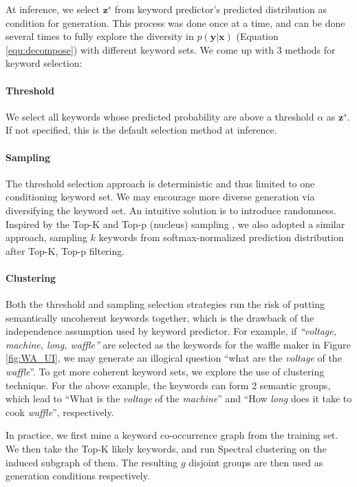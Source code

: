 At inference, we select $\mathbf{z}^s$ from keyword predictor's predicted distribution as condition for generation. This process was done once at a time, and can be done several times to fully explore the diversity in $p(\mathbf{y}|\mathbf{x})$ (Equation \ref{equ:decompose}) with different keyword sets. We come up with 3 methods for keyword selection:

\paragraph{Threshold} We select all keywords whose predicted probability are above a threshold $\alpha$ as $\mathbf{z}^s$. If not specified, this is the default selection method at inference.

\paragraph{Sampling} The threshold selection approach is deterministic and thus limited to one conditioning keyword set. We may encourage more diverse generation via diversifying the keyword set. An intuitive solution is to introduce randomness. Inspired by the Top-K \citep{fan-etal-2018-hierarchical, radford2019language} and Top-p (nucleus) sampling \citep{holtzman2019curious}, we also adopted a similar approach, sampling $k$ keywords from softmax-normalized prediction distribution after Top-K, Top-p filtering.

\paragraph{Clustering} Both the threshold and sampling selection strategies 
run the risk of putting semantically uncoherent keywords together, 
which is the drawback of the independence assumption used by keyword predictor. 
For example, if \textit{``voltage, machine, long, waffle''} are selected as 
the keywords for the waffle maker in Figure \ref{fig:WA_UI}, 
we may generate an illogical question ``what are the \textit{voltage} of 
the \textit{waffle}''. To get more coherent keyword sets, 
we explore the use of clustering technique. For the above example, 
the keywords can form 2 semantic groups, which lead to 
``What is the \textit{voltage} of the \textit{machine}'' and 
``How \textit{long} does it take to cook \textit{waffle}'', respectively. 

In practice, we first mine a keyword co-occurrence graph from the training set. We then take the Top-K likely keywords, and run Spectral clustering \citep{Shi00normalizedcuts} on the induced subgraph of them. The resulting $g$ disjoint groups are then used as generation conditions respectively.

